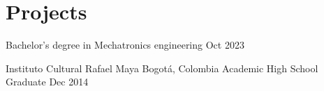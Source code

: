 \section*{Projects}
\begin{entrylist}
    \entry
    {}
    {}
    {Bachelor’s degree in Mechatronics engineering }
    {Oct 2023}
    {}

    \entry
    {Instituto Cultural Rafael Maya}
    {Bogotá, Colombia}
    {Academic High School Graduate}
    {Dec 2014}
    {}
\end{entrylist}